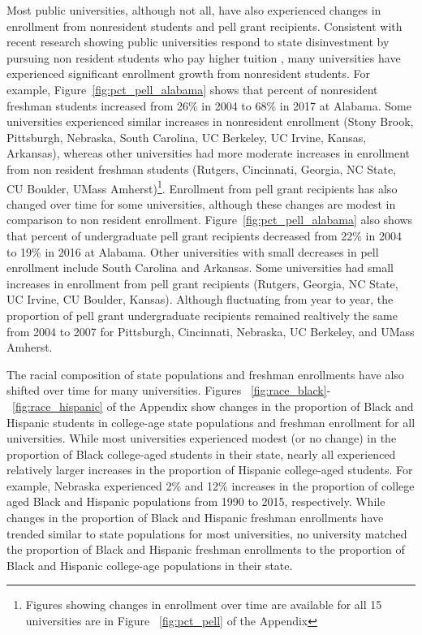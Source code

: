 \documentclass[twoside]{article}
\begin{document}
Most public universities, although not all, have also experienced changes in enrollment from nonresident students and pell grant recipients. Consistent with recent research showing public universities respond to state disinvestment by pursuing non resident students who pay higher tuition \citep{RN3753}, many universities have experienced significant enrollment growth from nonresident students. For example, Figure~\ref{fig:pct_pell_alabama} shows that percent of nonresident freshman students increased from 26\% in 2004 to 68\% in 2017 at Alabama. Some universities experienced similar increases in nonresident enrollment (Stony Brook, Pittsburgh, Nebraska, South Carolina, UC Berkeley, UC Irvine, Kansas, Arkansas), whereas other universities had more moderate increases in enrollment from non resident freshman students (Rutgers, Cincinnati, Georgia, NC State, CU Boulder, UMass Amherst)\footnote{Figures showing changes in enrollment over time are available for all 15 universities are in Figure ~\ref{fig:pct_pell} of the Appendix}. Enrollment from pell grant recipients has also changed over time for some universities, although these changes are modest in comparison to non resident enrollment. Figure~\ref{fig:pct_pell_alabama} also shows that percent of undergraduate pell grant recipients decreased from 22\% in 2004 to 19\% in 2016 at Alabama. Other universities with small decreases in pell enrollment include South Carolina and Arkansas.  Some universities had small increases in enrollment from pell grant recipients (Rutgers, Georgia, NC State, UC Irvine, CU Boulder, Kansas). Although fluctuating from year to year, the proportion of pell grant undergraduate recipients remained realtively the same from 2004 to 2007 for Pittsburgh, Cincinnati, Nebraska, UC Berkeley, and UMass Amherst. 

The racial composition of state populations and freshman enrollments have also shifted over time for many universities. Figures ~\ref{fig:race_black}-~\ref{fig:race_hispanic} of the Appendix show changes in the proportion of Black and Hispanic students in college-age state populations and freshman enrollment for all universities. While most universities experienced modest (or no change) in the proportion of Black college-aged students in their state, nearly all experienced relatively larger increases in the proportion of Hispanic college-aged students. For example, Nebraska experienced 2\% and 12\% increases in the proportion of college aged Black and Hispanic populations from 1990 to 2015, respectively. While changes in the proportion of Black and Hispanic freshman enrollments have trended similar to state populations for most universities, no university matched the proportion of Black and Hispanic freshman enrollments to the proportion of Black and Hispanic college-age populations in their state.  
\end{document}
